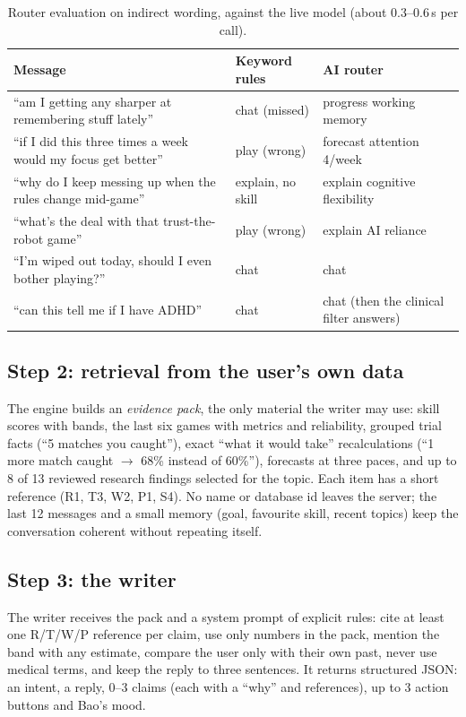 \documentclass[11pt,a4paper]{article}
\begin{document}
\begin{table}[h]
\centering\small
\caption{Router evaluation on indirect wording, against the live model (about 0.3--0.6\,s per call).}
\label{tab:router}
\begin{tabularx}{\linewidth}{@{}X >{\raggedright}p{3.6cm} >{\raggedright\arraybackslash}p{4.6cm}@{}}
\toprule
Message & Keyword rules & AI router\\
\midrule
``am I getting any sharper at remembering stuff lately'' & chat (missed) & progress \textperiodcentered{} working memory\\
``if I did this three times a week would my focus get better'' & play (wrong) & forecast \textperiodcentered{} attention \textperiodcentered{} 4/week\\
``why do I keep messing up when the rules change mid-game'' & explain, no skill & explain \textperiodcentered{} cognitive flexibility\\
``what's the deal with that trust-the-robot game'' & play (wrong) & explain \textperiodcentered{} AI reliance\\
``I'm wiped out today, should I even bother playing?'' & chat & chat\\
``can this tell me if I have ADHD'' & chat & chat (then the clinical filter answers)\\
\bottomrule
\end{tabularx}
\end{table}

\subsection{Step 2: retrieval from the user's own data}
The engine builds an \emph{evidence pack}, the only material the writer may use: skill scores with bands, the last six games with metrics and reliability, grouped trial facts (``5 matches you caught''), exact ``what it would take'' recalculations (``1 more match caught $\rightarrow$ 68\% instead of 60\%''), forecasts at three paces, and up to 8 of 13 reviewed research findings selected for the topic. Each item has a short reference (R1, T3, W2, P1, S4). No name or database id leaves the server; the last 12 messages and a small memory (goal, favourite skill, recent topics) keep the conversation coherent without repeating itself.

\subsection{Step 3: the writer}
The writer receives the pack and a system prompt of explicit rules: cite at least one R/T/W/P reference per claim, use only numbers in the pack, mention the band with any estimate, compare the user only with their own past, never use medical terms, and keep the reply to three sentences. It returns structured JSON: an intent, a reply, 0--3 claims (each with a ``why'' and references), up to 3 action buttons and Bao's mood.
\end{document}
